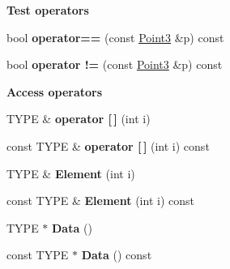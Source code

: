 \begin{Indent}\textbf{ Test operators}\par
\begin{DoxyCompactItemize}
\item 
\mbox{\label{classcy_1_1_point3_a6f161125db3cb779496c61f13724d1b5}} 
bool {\bfseries operator==} (const \mbox{\hyperlink{classcy_1_1_point3}{Point3}} \&p) const
\item 
\mbox{\label{classcy_1_1_point3_adea59e31566d64cee54b3cf88152b085}} 
bool {\bfseries operator !=} (const \mbox{\hyperlink{classcy_1_1_point3}{Point3}} \&p) const
\end{DoxyCompactItemize}
\end{Indent}
\begin{Indent}\textbf{ Access operators}\par
\begin{DoxyCompactItemize}
\item 
\mbox{\label{classcy_1_1_point3_a38f7f4ca11e463ab3eb3d5e8b1f2ce46}} 
T\+Y\+PE \& {\bfseries operator \mbox{[}$\,$\mbox{]}} (int i)
\item 
\mbox{\label{classcy_1_1_point3_abb915b7a32d789bf89ec7c5652b78b6d}} 
const T\+Y\+PE \& {\bfseries operator \mbox{[}$\,$\mbox{]}} (int i) const
\item 
\mbox{\label{classcy_1_1_point3_a7245f9195e6e03a350f03fe6937df915}} 
T\+Y\+PE \& {\bfseries Element} (int i)
\item 
\mbox{\label{classcy_1_1_point3_a77140650d3cd3c73ec0c2aaaee88029e}} 
const T\+Y\+PE \& {\bfseries Element} (int i) const
\item 
\mbox{\label{classcy_1_1_point3_a83b1947c98a38c4b32b1931ac353a542}} 
T\+Y\+PE $\ast$ {\bfseries Data} ()
\item 
\mbox{\label{classcy_1_1_point3_af1ecd3975119c3de4ef5dc936b349ec5}} 
const T\+Y\+PE $\ast$ {\bfseries Data} () const
\end{DoxyCompactItemize}
\end{Indent}
